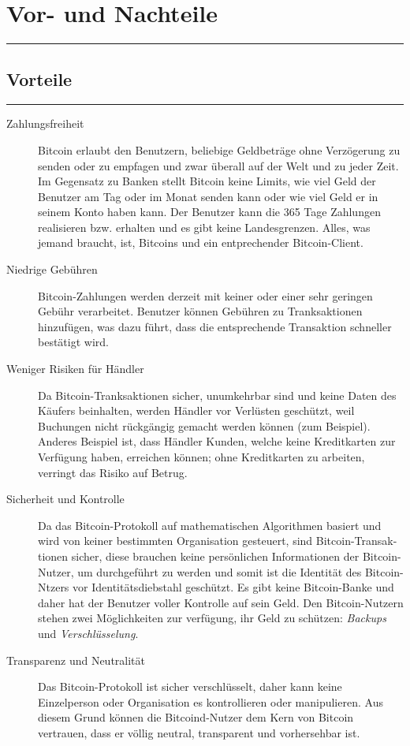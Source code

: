 \section*{Vor- und Nachteile}
\vspace{-10mm}
\noindent\rule{0.8\textwidth}{0.4pt}
\subsection*{Vorteile}
\vspace{-10mm}
\noindent\rule{0.8\textwidth}{0.4pt}
\begin{description}
  \item[Zahlungsfreiheit] Bitcoin erlaubt den Benutzern, beliebige Geldbeträge
  ohne Verzögerung zu senden oder zu empfagen und zwar überall auf der Welt und
  zu jeder Zeit. Im Gegensatz zu Banken stellt Bitcoin keine Limits, wie viel Geld
  der Benutzer am Tag oder im Monat senden kann oder wie viel Geld er in seinem
  Konto haben kann. Der Benutzer kann die 365 Tage Zahlungen realisieren bzw.
  erhalten und es gibt keine Landesgrenzen. Alles, was jemand braucht, ist, Bitcoins
  und ein entprechender Bitcoin-Client.
  \item[Niedrige Gebühren] Bitcoin-Zahlungen werden derzeit mit keiner oder einer
  sehr geringen Gebühr verarbeitet. Benutzer können Gebühren zu Tranksaktionen
  hinzufügen, was dazu führt, dass die entsprechende Transaktion schneller bestätigt wird.
  \item[Weniger Risiken für Händler] Da Bitcoin-Tranksaktionen sicher, unumkehrbar sind und
  keine Daten des Käufers beinhalten, werden Händler vor Verlüsten geschützt, weil
  Buchungen nicht rückgängig gemacht werden können (zum Beispiel). Anderes Beispiel
  ist, dass Händler Kunden, welche keine Kreditkarten zur Verfügung haben, erreichen
  können; ohne Kreditkarten zu arbeiten, verringt das Risiko auf Betrug.
  \item[Sicherheit und Kontrolle] Da das Bitcoin-Protokoll auf mathematischen Algorithmen
  basiert und wird von keiner bestimmten Organisation gesteuert, sind Bitcoin-Transak-tionen sicher,
  diese brauchen keine persönlichen Informationen der Bitcoin-Nutzer, um durchgeführt zu werden
  und somit ist die Identität des Bitcoin-Ntzers vor Identitätsdiebstahl geschützt. Es gibt keine Bitcoin-Banke und daher
  hat der Benutzer voller Kontrolle auf sein Geld. Den Bitcoin-Nutzern stehen zwei Möglichkeiten
  zur verfügung, ihr Geld zu schützen: \emph{Backups} und \emph{Verschlüsselung}.
  \item[Transparenz und Neutralität] Das Bitcoin-Protokoll ist sicher verschlüsselt, daher kann
  keine Einzelperson oder Organisation es kontrollieren oder manipulieren. Aus diesem Grund können die Bitcoind-Nutzer
  dem Kern von Bitcoin vertrauen, dass er völlig neutral, transparent und vorhersehbar ist.

\end{description}
